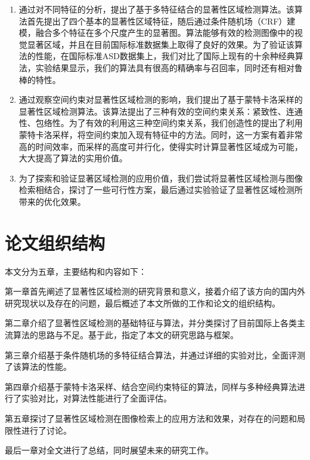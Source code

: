 \begin{enumerate}
\item 通过对不同特征的分析，提出了基于多特征结合的显著性区域检测算法。该算法首先提出了四个基本的显著性区域特征，随后通过条件随机场（CRF）建模，融合多个特征在多个尺度产生的显著图。算法能够有效的检测图像中的视觉显著区域，并且在目前国际标准数据集上取得了良好的效果。为了验证该算法的性能，在国际标准ASD数据集上，我们对比了国际上现有的十余种经典算法，实验结果显示，我们的算法具有很高的精确率与召回率，同时还有相对鲁棒的特性。
\item 通过观察空间约束对显著性区域检测的影响，我们提出了基于蒙特卡洛采样的显著性区域检测算法。该算法提出了三种有效的空间约束关系：紧致性、连通性、包络性。为了有效的利用这三种空间约束关系，我们创造性的提出了利用蒙特卡洛采样，将空间约束加入现有特征中的方法。同时，这一方案有着非常高的时间效率，而采样的高度可并行化，使得实时计算显著性区域成为可能，大大提高了算法的实用价值。
\item 为了探索和验证显著区域检测的应用价值，我们尝试将显著性区域检测与图像检索相结合，探讨了一些可行性方案，最后通过实验验证了显著性区域检测所带来的优化效果。
\end{enumerate}

\section{论文组织结构}
本文分为五章，主要结构和内容如下：

第一章首先阐述了显著性区域检测的研究背景和意义，接着介绍了该方向的国内外研究现状以及存在的问题，最后概述了本文所做的工作和论文的组织结构。

第二章介绍了显著性区域检测的基础特征与算法，并分类探讨了目前国际上各类主流算法的思路与不足。基于此，指定了本文的研究思路与框架。

第三章介绍基于条件随机场的多特征结合算法，并通过详细的实验对比，全面评测了该算法的性能。

第四章介绍基于蒙特卡洛采样、结合空间约束特征的算法，同样与多种经典算法进行了实验对比，对算法性能进行了全面评估。

第五章探讨了显著性区域检测在图像检索上的应用方法和效果，对存在的问题和局限性进行了讨论。

最后一章对全文进行了总结，同时展望未来的研究工作。
